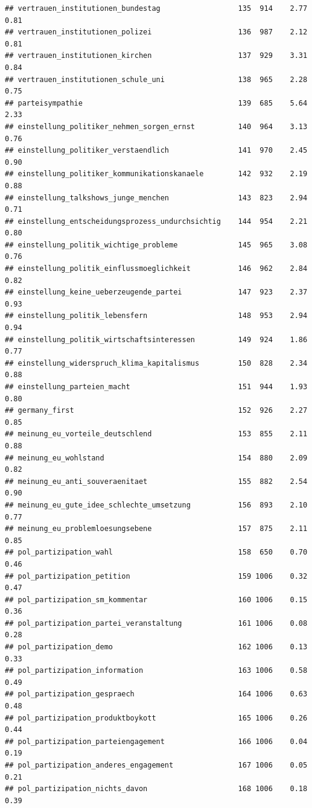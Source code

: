 \documentclass[
]{book}
\begin{document}
\begin{verbatim}
## vertrauen_institutionen_bundestag                  135  914    2.77   0.81
## vertrauen_institutionen_polizei                    136  987    2.12   0.81
## vertrauen_institutionen_kirchen                    137  929    3.31   0.84
## vertrauen_institutionen_schule_uni                 138  965    2.28   0.75
## parteisympathie                                    139  685    5.64   2.33
## einstellung_politiker_nehmen_sorgen_ernst          140  964    3.13   0.76
## einstellung_politiker_verstaendlich                141  970    2.45   0.90
## einstellung_politiker_kommunikationskanaele        142  932    2.19   0.88
## einstellung_talkshows_junge_menchen                143  823    2.94   0.71
## einstellung_entscheidungsprozess_undurchsichtig    144  954    2.21   0.80
## einstellung_politik_wichtige_probleme              145  965    3.08   0.76
## einstellung_politik_einflussmoeglichkeit           146  962    2.84   0.82
## einstellung_keine_ueberzeugende_partei             147  923    2.37   0.93
## einstellung_politik_lebensfern                     148  953    2.94   0.94
## einstellung_politik_wirtschaftsinteressen          149  924    1.86   0.77
## einstellung_widerspruch_klima_kapitalismus         150  828    2.34   0.88
## einstellung_parteien_macht                         151  944    1.93   0.80
## germany_first                                      152  926    2.27   0.85
## meinung_eu_vorteile_deutschlend                    153  855    2.11   0.88
## meinung_eu_wohlstand                               154  880    2.09   0.82
## meinung_eu_anti_souveraenitaet                     155  882    2.54   0.90
## meinung_eu_gute_idee_schlechte_umsetzung           156  893    2.10   0.77
## meinung_eu_problemloesungsebene                    157  875    2.11   0.85
## pol_partizipation_wahl                             158  650    0.70   0.46
## pol_partizipation_petition                         159 1006    0.32   0.47
## pol_partizipation_sm_kommentar                     160 1006    0.15   0.36
## pol_partizipation_partei_veranstaltung             161 1006    0.08   0.28
## pol_partizipation_demo                             162 1006    0.13   0.33
## pol_partizipation_information                      163 1006    0.58   0.49
## pol_partizipation_gespraech                        164 1006    0.63   0.48
## pol_partizipation_produktboykott                   165 1006    0.26   0.44
## pol_partizipation_parteiengagement                 166 1006    0.04   0.19
## pol_partizipation_anderes_engagement               167 1006    0.05   0.21
## pol_partizipation_nichts_davon                     168 1006    0.18   0.39

\end{verbatim}
\end{document}
